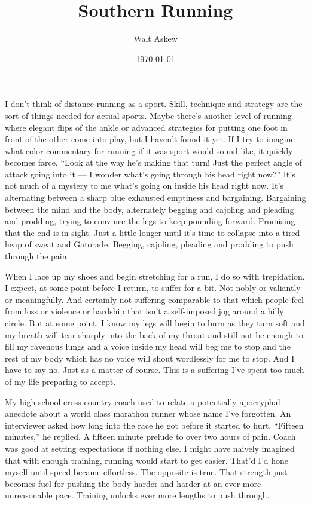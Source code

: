 \documentclass[12pt, oneside]{memoir}
\title{Southern Running}
\author{Walt Askew}
\date{\today}
\begin{document}
\maketitle

I don't think of distance running as a sport.
Skill, technique and strategy are the sort of things needed for
actual sports.
Maybe there's another level of running where elegant flips of the
ankle or advanced strategies for putting one foot in front of the
other come into play, but I haven't found it yet.
If I try to imagine what color commentary for running-if-it-was-sport
would sound like, it quickly becomes farce.
``Look at the way he's making that turn! Just the perfect angle of
attack going into it --- I wonder what's going through his head right
now?''
It's not much of a mystery to me what's going on inside his head right
now. 
It's alternating between a sharp blue exhausted emptiness and
bargaining.
Bargaining between the mind and the body, alternately begging and
cajoling and pleading and prodding, trying to convince the legs to
keep pounding forward.
Promising that the end is in sight.
Just a little longer until it's time to collapse into a tired heap of
sweat and Gatorade. 
Begging, cajoling, pleading and prodding to push through the pain.

When I lace up my shoes and begin stretching for a run, I do so with
trepidation.
I expect, at some point before I return, to suffer for a bit.
Not nobly or valiantly or meaningfully.
And certainly not suffering comparable to that which people feel from
loss or violence or hardship that isn't a self-imposed jog around a
hilly circle.
But at some point, I know my legs will begin to burn as they turn
soft and my breath will tear sharply into the back of my throat and
still not be enough to fill my ravenous lungs and a voice inside my
head will beg me to stop and the rest of my body which has no voice
will shout wordlessly for me to stop.
And I have to say no.
Just as a matter of course.
This is a suffering I've spent too much of my life preparing to
accept.

My high school cross country coach used to relate a potentially
apocryphal anecdote about a world class marathon runner whose name
I've forgotten.
An interviewer asked how long into the race he got before it started
to hurt.
``Fifteen minutes,'' he replied.
A fifteen minute prelude to over two hours of pain.
Coach was good at setting expectations if nothing else.
I might have naively imagined that with enough training,
running would start to get easier.
That'd I'd hone myself until speed became effortless.
The opposite is true.
That strength just becomes fuel for pushing the body harder and harder
at an ever more unreasonable pace.
Training unlocks ever more lengths to push through.
\end{document}
